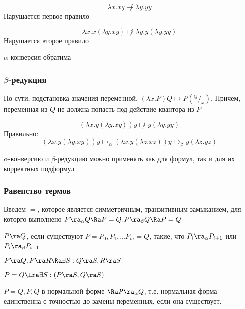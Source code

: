 \begin{example}
    \[\lambda x.xy \not\mapsto \lambda y.yy\]
    Нарушается первое правило
\end{example}
\begin{example}
    \[\lambda x.x(\lambda y.xy) \not\mapsto \lambda y.y(\lambda y.yy)\]
    Нарушается второе правило
\end{example}

\begin{proposition}
    \(\alpha\)-конверсия обратима
\end{proposition}

\subsubsection{\(\beta\)-редукция}
По сути, подстановка значения переменной. \((\lambda x.P)Q \mapsto P(^Q/_x)\). Причем, переменная из \(Q\) не должна попасть под действие квантора из \(P\)

\begin{example}
    \[(\lambda x.y(\lambda y.xy))y \not\mapsto y(\lambda y.yy)\]
    Правильно:
    \[(\lambda x.y(\lambda y.xy))y \mapsto_\alpha (\lambda x.y(\lambda z.xz))y \mapsto_\beta y(\lambda z.yz)\]
\end{example}
\begin{note}
    \(\alpha\)-конверсию и \(\beta\)-редукцию можно применять как для формул, так и для их корректных подформул
\end{note}
\subsubsection{Равенство термов}
Введем \(=\), которое является симметричным, транзитивным замыканием, для которго выполнено \(P \ra_\alpha Q \Ra P = Q, P \ra_\beta Q \Ra P = Q\)

\begin{definition}
    \(P \ra Q\), если существуют \(P = P_0, P_1, \dots P_m = Q\), такие, что \(P_i \ra_\alpha P_{i + 1}\) или \(P_i \ra_\beta P_{i + 1}\).
\end{definition}

\begin{theorem}
    \(P \ra Q, P \ra R \Ra \exists S: Q \ra S, R \ra S\)
\end{theorem}
\begin{corollary}
    \(P = Q \Lra \exists S: (P \ra S, Q \ra S)\)
\end{corollary}
\begin{corollary}
    \(P = Q, P, Q\) в нормальной форме \(\Ra P \ra_\alpha Q\), т.е. нормальная форма единственна с точностью до замены переменных, если она существует.
\end{corollary}

